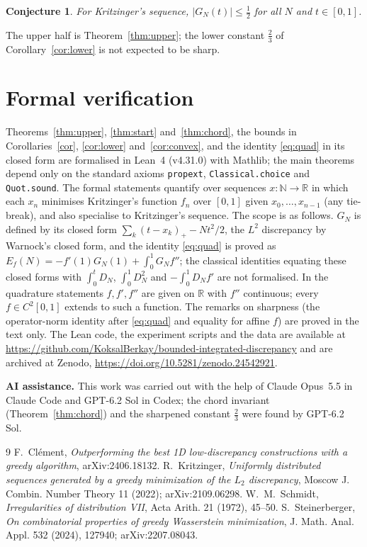 \documentclass[11pt]{amsart}
\newtheorem{conjecture}[theorem]{Conjecture}
\theoremstyle{remark}
\begin{document}
\begin{conjecture}
For Kritzinger's sequence, $|G_N(t)|\le\frac12$ for all $N$ and $t\in[0,1]$.
\end{conjecture}

The upper half is Theorem~\ref{thm:upper}; the lower constant $\frac23$
of Corollary~\ref{cor:lower} is not expected to be sharp.

\section{Formal verification}

Theorems~\ref{thm:upper}, \ref{thm:start} and~\ref{thm:chord}, the bounds in
Corollaries~\ref{cor}, \ref{cor:lower} and~\ref{cor:convex}, and the identity
\eqref{eq:quad} in its closed form are formalised in Lean~4 (v4.31.0) with
Mathlib; the main theorems depend only on the standard axioms
\texttt{propext}, \texttt{Classical.choice} and \texttt{Quot.sound}. The formal
statements quantify over sequences $x:\mathbb N\to\mathbb R$ in which each
$x_n$ minimises Kritzinger's function $f_n$ over $[0,1]$ given
$x_0,\dots,x_{n-1}$ (any tie-break), and also specialise to Kritzinger's
sequence. The scope is as follows. $G_N$ is defined by its closed form
$\sum_k(t-x_k)_+-Nt^2/2$, the $L^2$ discrepancy by Warnock's closed form, and
the identity \eqref{eq:quad} is proved as
$E_f(N)=-f'(1)G_N(1)+\int_0^1G_Nf''$; the classical identities equating these
closed forms with $\int_0^tD_N$, $\int_0^1D_N^2$ and $-\int_0^1D_Nf'$ are not
formalised. In the quadrature statements $f,f',f''$ are given on $\mathbb R$
with $f''$ continuous; every $f\in C^2[0,1]$ extends to such a function. The
remarks on sharpness (the operator-norm identity after \eqref{eq:quad} and
equality for affine $f$) are proved in the text only.
The Lean code, the experiment scripts and the data are available at
\url{https://github.com/KoksalBerkay/bounded-integrated-discrepancy} and are
archived at Zenodo, \url{https://doi.org/10.5281/zenodo.24542921}.

\medskip
\noindent\textbf{AI assistance.} This work was carried out with the help of
Claude Opus~5.5 in Claude Code and GPT-6.2 Sol in Codex; the chord invariant
(Theorem~\ref{thm:chord}) and the sharpened constant $\frac23$ were found by
GPT-6.2 Sol.

\begin{thebibliography}{9}
 F.~Cl\'ement, \emph{Outperforming the best 1D
low-discrepancy constructions with a greedy algorithm}, arXiv:2406.18132.
 R.~Kritzinger, \emph{Uniformly distributed sequences generated by
a greedy minimization of the $L_2$ discrepancy}, Moscow J. Combin. Number
Theory 11 (2022); arXiv:2109.06298.
 W.~M.~Schmidt, \emph{Irregularities of distribution VII}, Acta
Arith. 21 (1972), 45--50.
 S.~Steinerberger, \emph{On combinatorial properties of greedy
Wasserstein minimization}, J. Math. Anal. Appl. 532 (2024), 127940;
arXiv:2207.08043.
\end{thebibliography}
\end{document}
